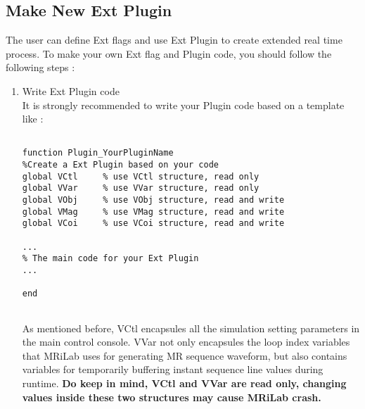 \documentclass{book}%
\begin{document}
\subsection{Make New Ext Plugin}

The user can define Ext flags and use Ext Plugin to create extended real time process. To make your own Ext flag and Plugin code, you should follow the following steps :

\begin{enumerate}

\item Write Ext Plugin code \\

It is strongly recommended to write your Plugin code based on a template like :

\begin{verbatim}

function Plugin_YourPluginName
%Create a Ext Plugin based on your code
global VCtl     % use VCtl structure, read only
global VVar     % use VVar structure, read only
global VObj     % use VObj structure, read and write
global VMag     % use VMag structure, read and write
global VCoi     % use VCoi structure, read and write

...
% The main code for your Ext Plugin
...

end


\end{verbatim}

As mentioned before, VCtl encapsules all the simulation setting parameters in the main control console. VVar not only encapsules the loop index variables that MRiLab uses for generating MR sequence waveform, but also contains variables for temporarily buffering instant sequence line values during runtime. \textbf{Do keep in mind, VCtl and VVar are read only, changing values inside these two structures may cause MRiLab crash.}


\end{enumerate}
\end{document}
